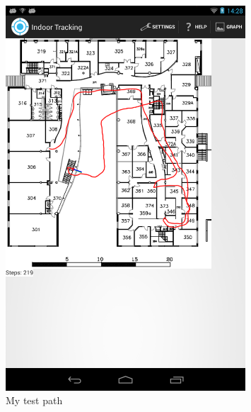 \documentclass[11pt]{article}
\begin{document}
\begin{figure}[p]
\centering
\includegraphics[width=0.8\textwidth]{screenshot.png}
\caption{My test path}
\label{fig:test_path}
\end{figure}
\end{document}
